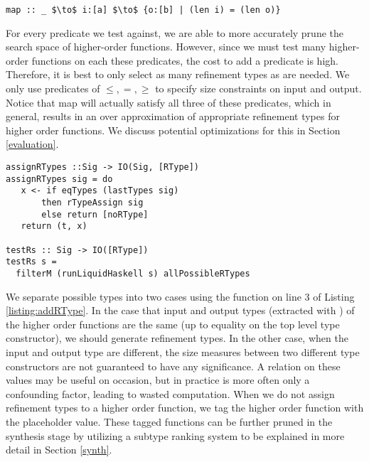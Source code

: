 \begin{lstlisting}[numbers=none]
map :: _ $\to$ i:[a] $\to$ {o:[b] | (len i) = (len o)}
\end{lstlisting}


For every predicate we test against, we are able to more accurately prune the search space of higher-order functions.
However, since we must test many higher-order functions on each these predicates, the cost to add a predicate is high.
Therefore, it is best to only select as many refinement types as are needed.
We only use predicates of $\leq,=,\geq$ to specify size constraints on input and output.
Notice that map will actually satisfy all three of these predicates, which in general, results in an over approximation of appropriate refinement types for higher order functions.
We discuss potential optimizations for this in Section \ref{evaluation}.

\begin{lstlisting}[caption=Adding refinement types to higher order functions,label=listing:addRType]
assignRTypes ::Sig -> IO(Sig, [RType])
assignRTypes sig = do
   x <- if eqTypes (lastTypes sig) 
       then rTypeAssign sig
       else return [noRType]
   return (t, x)

testRs :: Sig -> IO([RType])
testRs s =
  filterM (runLiquidHaskell s) allPossibleRTypes
\end{lstlisting}

We separate possible types into two cases using the  function on line 3 of Listing \ref{listing:addRType}.
In the case that input and output types (extracted with ) of the higher order functions are the same (up to equality on the top level type constructor), we should generate refinement types.
In the other case, when the input and output type are different, the size measures between two different type constructors are not guaranteed to have any significance.
A relation on these values may be useful on occasion, but in practice is more often only a confounding factor, leading to wasted computation.
When we do not assign refinement types to a higher order function, we tag the higher order function with the placeholder  value.
These  tagged functions can be further pruned in the synthesis stage by utilizing a subtype ranking system to be explained in more detail in Section \ref{synth}.

